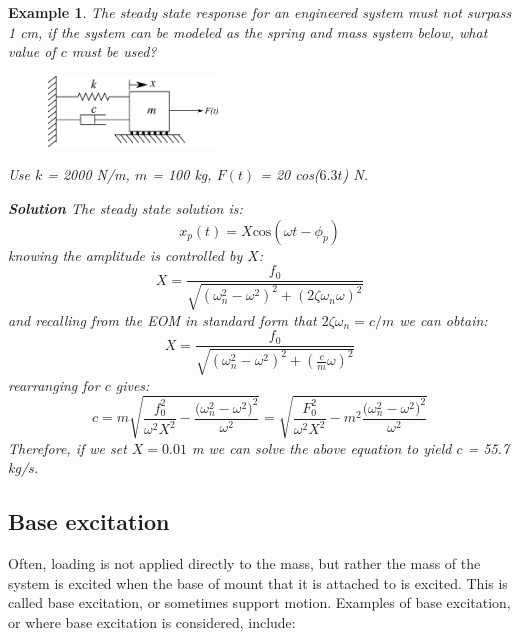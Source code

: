 \documentclass[12pt,letter]{article}
\newtheorem{ex}{Example}
\numberwithin{ex}{section} %
\newenvironment{example}{\begin{mdframed}[middlelinewidth=0.5mm]\begin{ex}\normalfont}{\end{ex}\end{mdframed}}
\begin{document}
\begin{example}

		

			The steady state response for an engineered system must not surpass 1 cm, if the system can be modeled as the spring and mass system below, what value of $c$ must be used?  
			\begin{figure}[H]
				\centering
				\includegraphics[width=0.4\textwidth]{../Figures/system_1DOF_horiziontal_damped_forced.png}
			\end{figure}	
			Use $k$ = 2000 N/m, $m$ = 100 kg, $F(t)$ = 20 cos($6.3t$) N. 			

			\textbf{Solution}
			The steady state solution is:
			\begin{equation}
				x_p(t) = X \text{cos}(\omega t - \phi_p)
			\end{equation}			 
			knowing the amplitude is controlled by $X$: 
			\begin{equation}
				X = \frac{f_0}{\sqrt{(\omega_n^2 - \omega^2)^2 +  (2\zeta \omega_n \omega)^2}} 
			\end{equation}	
			and recalling from the EOM in standard form that $2\zeta \omega_n = c/m$ we can obtain:
			\begin{equation}
				X = \frac{f_0}{\sqrt{(\omega_n^2 - \omega^2)^2 +  (\frac{c}{m} \omega)^2}} 
			\end{equation}		
			rearranging for $c$ gives:		
			\begin{equation}
				c = m\sqrt{\frac{f_0^2}{\omega^2 X^2}-\frac{\big(\omega_n^2-\omega^2\big)^2}{\omega^2}} = \sqrt{\frac{F_0^2}{\omega^2 X^2}-m^2\frac{\big(\omega_n^2-\omega^2\big)^2}{\omega^2}} 
			\end{equation}
			Therefore, if we set $X=0.01$ m we can solve the above equation to yield $c$ = 55.7 kg/s.
			
\end{example}	


	
		\subsection{Base excitation}

Often, loading is not applied directly to the mass, but rather the mass of the system is excited when the base of mount that it is attached to is excited. This is called base excitation, or sometimes support motion. Examples of base excitation, or where base excitation is considered, include:
\end{document}
